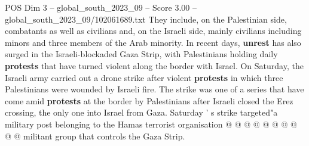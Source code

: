 \begin{textsample}{POS Dim 3 – global\_south\_2023\_09 – Score 3.00 – global\_south\_2023\_09/102061689.txt}
They include, on the Palestinian side, combatants as well as civilians and, on the Israeli side, mainly civilians including minors and three members of the Arab minority.
In recent days, \textbf{unrest} has also surged in the Israeli-blockaded Gaza Strip, with Palestinians holding daily \textbf{protests} that have turned violent along the border with Israel.
On Saturday, the Israeli army carried out a drone strike after violent \textbf{protests} in which three Palestinians were wounded by Israeli fire.
The strike was one of a series that have come amid \textbf{protests} at the border by Palestinians after Israeli closed the Erez crossing, the only one into Israel from Gaza.
Saturday ' s strike targeted"a military post belonging to the Hamas terrorist organisation @ @ @ @ @ @ @ @ @ @ militant group that controls the Gaza Strip.

\end{textsample}
